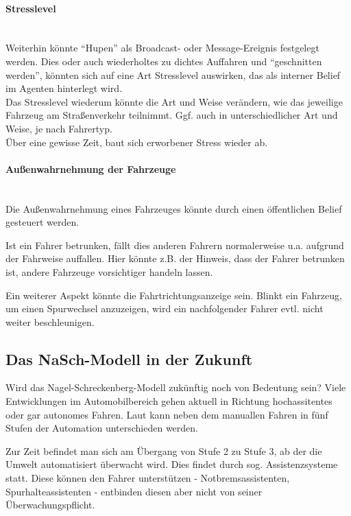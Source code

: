 \paragraph*{Stresslevel}
\hfill \\
Weiterhin könnte \enquote{Hupen} als Broadcast- oder Message-Ereignis festgelegt werden.
Dies oder auch wiederholtes zu dichtes Auffahren und \enquote{geschnitten werden}, könnten sich auf eine Art Stresslevel auswirken, das als interner Belief im Agenten hinterlegt wird.
\\
Das Stresslevel wiederum könnte die Art und Weise verändern, wie das jeweilige Fahrzeug am Straßenverkehr teilnimmt. 
Ggf. auch in unterschiedlicher Art und Weise, je nach Fahrertyp.
\\
Über eine gewisse Zeit, baut sich erworbener Stress wieder ab.

\paragraph*{Außenwahrnehmung der Fahrzeuge}
\hfill \\
Die Außenwahrnehmung eines Fahrzeuges könnte durch einen öffentlichen Belief gesteuert werden. 

Ist ein Fahrer betrunken, fällt dies anderen Fahrern normalerweise u.a. aufgrund der Fahrweise auffallen.
Hier könnte z.B. der Hinweis, dass der Fahrer betrunken ist, andere Fahrzeuge vorsichtiger handeln lassen.

Ein weiterer Aspekt könnte die Fahrtrichtungsanzeige sein.
Blinkt ein Fahrzeug, um einen Spurwechsel anzuzeigen, wird ein nachfolgender Fahrer evtl. nicht weiter beschleunigen. 






\subsection{Das NaSch-Modell in der Zukunft}

Wird das Nagel-Schreckenberg-Modell zukünftig noch von Bedeutung sein? 
Viele Entwicklungen im Automobilbereich gehen aktuell in Richtung hochassitentes oder gar autonomes Fahren.
Laut \cite{automation-level} kann neben dem manuallen Fahren in fünf Stufen der Automation unterschieden werden.

Zur Zeit befindet man sich am Übergang von Stufe 2 zu Stufe 3, ab der die Umwelt automatisiert überwacht wird.
Dies findet durch sog. Assistenzsysteme statt.
Diese können den Fahrer unterstützen - Notbremsassistenten, Spurhalteassistenten - entbinden diesen aber nicht von seiner Überwachungspflicht.

